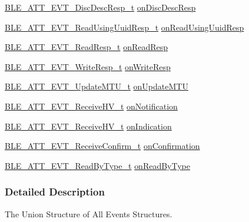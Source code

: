 \begin{DoxyCompactItemize}
\hyperlink{struct_b_l_e___a_t_t___e_v_t___disc_desc_resp__t}{B\+L\+E\+\_\+\+A\+T\+T\+\_\+\+E\+V\+T\+\_\+\+Disc\+Desc\+Resp\+\_\+t} \hyperlink{union_b_l_e___g_a_t_t_event_field_a77287d250fec713c8af90b8f92b99df3}{on\+Disc\+Desc\+Resp}
\item 
\hyperlink{struct_b_l_e___a_t_t___e_v_t___read_using_uuid_resp__t}{B\+L\+E\+\_\+\+A\+T\+T\+\_\+\+E\+V\+T\+\_\+\+Read\+Using\+Uuid\+Resp\+\_\+t} \hyperlink{union_b_l_e___g_a_t_t_event_field_a3e14b482ac3fec112b76834856fa9ad9}{on\+Read\+Using\+Uuid\+Resp}
\item 
\hyperlink{struct_b_l_e___a_t_t___e_v_t___read_resp__t}{B\+L\+E\+\_\+\+A\+T\+T\+\_\+\+E\+V\+T\+\_\+\+Read\+Resp\+\_\+t} \hyperlink{union_b_l_e___g_a_t_t_event_field_a8b9e6db4f9b2c7dd8c806e52d7085808}{on\+Read\+Resp}
\item 
\hyperlink{struct_b_l_e___a_t_t___e_v_t___write_resp__t}{B\+L\+E\+\_\+\+A\+T\+T\+\_\+\+E\+V\+T\+\_\+\+Write\+Resp\+\_\+t} \hyperlink{union_b_l_e___g_a_t_t_event_field_a424b08ab9437012e89570fde2be1b907}{on\+Write\+Resp}
\item 
\hyperlink{struct_b_l_e___a_t_t___e_v_t___update_m_t_u__t}{B\+L\+E\+\_\+\+A\+T\+T\+\_\+\+E\+V\+T\+\_\+\+Update\+M\+T\+U\+\_\+t} \hyperlink{union_b_l_e___g_a_t_t_event_field_ab8b113c7b94e4c7cb5dcc765375a5e55}{on\+Update\+M\+TU}
\item 
\hyperlink{struct_b_l_e___a_t_t___e_v_t___receive_h_v__t}{B\+L\+E\+\_\+\+A\+T\+T\+\_\+\+E\+V\+T\+\_\+\+Receive\+H\+V\+\_\+t} \hyperlink{union_b_l_e___g_a_t_t_event_field_a71605841ad1c0717626d6e50800bfe31}{on\+Notification}
\item 
\hyperlink{struct_b_l_e___a_t_t___e_v_t___receive_h_v__t}{B\+L\+E\+\_\+\+A\+T\+T\+\_\+\+E\+V\+T\+\_\+\+Receive\+H\+V\+\_\+t} \hyperlink{union_b_l_e___g_a_t_t_event_field_a7a390c18cfef6a34e220d686e0593381}{on\+Indication}
\item 
\hyperlink{struct_b_l_e___a_t_t___e_v_t___receive_confirm__t}{B\+L\+E\+\_\+\+A\+T\+T\+\_\+\+E\+V\+T\+\_\+\+Receive\+Confirm\+\_\+t} \hyperlink{union_b_l_e___g_a_t_t_event_field_ad1debf52c91cd421e71bd4be0c0b6a2b}{on\+Confirmation}
\item 
\hyperlink{struct_b_l_e___a_t_t___e_v_t___read_by_type__t}{B\+L\+E\+\_\+\+A\+T\+T\+\_\+\+E\+V\+T\+\_\+\+Read\+By\+Type\+\_\+t} \hyperlink{union_b_l_e___g_a_t_t_event_field_a2835d2ba03d8acf74284ba27b3419714}{on\+Read\+By\+Type}
\end{DoxyCompactItemize}


\subsubsection{Detailed Description}
The Union Structure of All Events Structures. 

